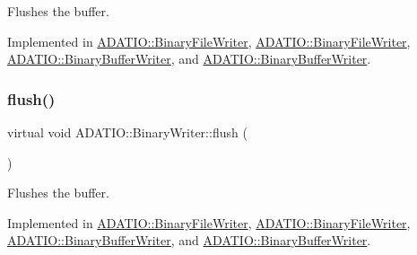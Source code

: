 Flushes the buffer. 



Implemented in \mbox{\hyperlink{classADATIO_1_1BinaryFileWriter_ad914b901c6386a2ad7b2c8cf9bddfa9b}{A\+D\+A\+T\+I\+O\+::\+Binary\+File\+Writer}}, \mbox{\hyperlink{classADATIO_1_1BinaryFileWriter_ad914b901c6386a2ad7b2c8cf9bddfa9b}{A\+D\+A\+T\+I\+O\+::\+Binary\+File\+Writer}}, \mbox{\hyperlink{classADATIO_1_1BinaryBufferWriter_accc3319508a804b054d21b6bddeef85d}{A\+D\+A\+T\+I\+O\+::\+Binary\+Buffer\+Writer}}, and \mbox{\hyperlink{classADATIO_1_1BinaryBufferWriter_accc3319508a804b054d21b6bddeef85d}{A\+D\+A\+T\+I\+O\+::\+Binary\+Buffer\+Writer}}.

\mbox{\label{classADATIO_1_1BinaryWriter_a1d335eeed64094b8641f3ebf731c981e}} 
\subsubsection{\texorpdfstring{flush()}{flush()}\hspace{0.1cm}{\footnotesize\ttfamily [2/2]}}
{\footnotesize\ttfamily virtual void A\+D\+A\+T\+I\+O\+::\+Binary\+Writer\+::flush (\begin{DoxyParamCaption}{ }\end{DoxyParamCaption})\hspace{0.3cm}{\ttfamily [pure virtual]}}



Flushes the buffer. 



Implemented in \mbox{\hyperlink{classADATIO_1_1BinaryFileWriter_ad914b901c6386a2ad7b2c8cf9bddfa9b}{A\+D\+A\+T\+I\+O\+::\+Binary\+File\+Writer}}, \mbox{\hyperlink{classADATIO_1_1BinaryFileWriter_ad914b901c6386a2ad7b2c8cf9bddfa9b}{A\+D\+A\+T\+I\+O\+::\+Binary\+File\+Writer}}, \mbox{\hyperlink{classADATIO_1_1BinaryBufferWriter_accc3319508a804b054d21b6bddeef85d}{A\+D\+A\+T\+I\+O\+::\+Binary\+Buffer\+Writer}}, and \mbox{\hyperlink{classADATIO_1_1BinaryBufferWriter_accc3319508a804b054d21b6bddeef85d}{A\+D\+A\+T\+I\+O\+::\+Binary\+Buffer\+Writer}}.

\mbox{\label{classADATIO_1_1BinaryWriter_a8bebb70a7248b14c8a4dcf7aa49c1503}} 
